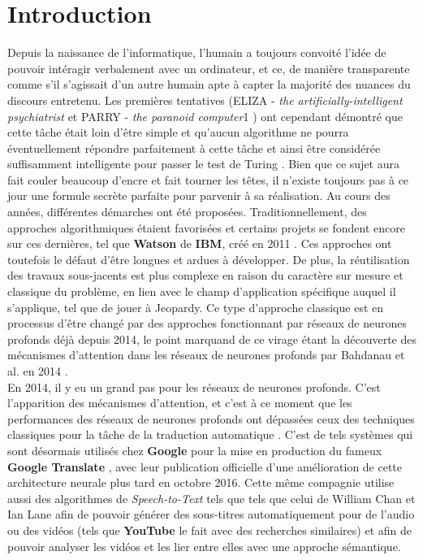 \section{Introduction}

Depuis la naissance de l'informatique, l'humain a toujours convoité l'idée de pouvoir intéragir verbalement avec un ordinateur, et ce, de manière transparente comme s'il s'agissait d'un autre humain apte à capter la majorité des nuances du discours entretenu. Les premières tentatives (ELIZA - \textit{the artificially-intelligent psychiatrist} \cite{elizaWeizenbaum} et PARRY - \textit{the paranoid computer}1 \cite{parryCerf}) ont cependant démontré que cette tâche était loin d'être simple et qu'aucun algorithme ne pourra éventuellement répondre parfaitement à cette tâche et ainsi être considérée suffisamment intelligente pour passer le test de Turing \cite{turingTest}. Bien que ce sujet aura fait couler beaucoup d'encre et fait tourner les têtes, il n'existe toujours pas à ce jour une formule secrète parfaite pour parvenir à sa réalisation. Au cours des années, différentes démarches ont été proposées. Traditionnellement, des approches algorithmiques étaient favorisées et certains projets se fondent encore sur ces dernières, tel que \textbf{Watson} de \textbf{IBM}, créé en 2011 \cite{ibmWatson}. Ces approches ont toutefois le défaut d'être longues et ardues à développer. De plus, la réutilisation des travaux sous-jacents est plus complexe en raison du caractère sur mesure et classique du problème, en lien avec le champ d'application spécifique auquel il s'applique, tel que de jouer à Jeopardy. Ce type d'approche classique est en processus d'être changé par des approches fonctionnant par réseaux de neurones profonds déjà depuis 2014, le point marquand de ce virage étant la découverte des mécanismes d'attention dans les réseaux de neurones profonds par Bahdanau et al. en 2014 \cite{attentionMechanism}.  \\

En 2014, il y eu un grand pas pour les réseaux de neurones profonds. C'est l'apparition des mécanismes d'attention, et c'est à ce moment que les performances des réseaux de neurones profonds ont dépassées ceux des techniques classiques pour la tâche de la traduction automatique \cite{attentionMechanism}. C’est de tels systèmes qui sont désormais utilisés chez \textbf{Google} pour la mise en production du fameux \textbf{Google Translate} \cite{googleTranslate}, avec leur publication officielle d'une amélioration de cette architecture neurale plus tard en octobre 2016. Cette même compagnie utilise aussi des algorithmes de \textit{Speech-to-Text} tels que tels que celui de William Chan et Ian Lane \cite{acousticModeling} afin de pouvoir générer des sous-titres automatiquement pour de l'audio ou des vidéos (tels que \textbf{YouTube} le fait avec des recherches similaires) et afin de pouvoir analyser les vidéos et les lier entre elles avec une approche sémantique. \\

